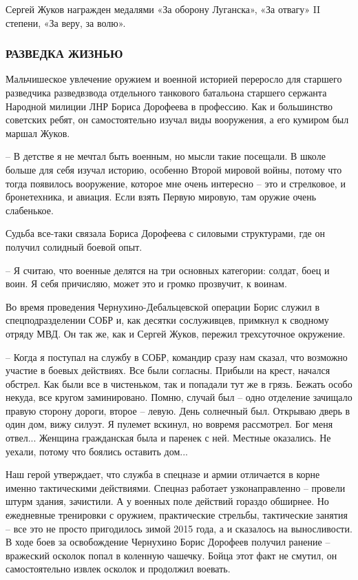Сергей Жуков награжден медалями «За оборону Луганска», «За отвагу» II степени,
«За веру, за волю».

\subsubsection{РАЗВЕДКА ЖИЗНЬЮ}

Мальчишеское увлечение оружием и военной историей переросло для старшего
разведчика разведвзвода отдельного танкового батальона старшего сержанта
Народной милиции ЛНР Бориса Дорофеева в профессию. Как и большинство советских
ребят, он самостоятельно изучал виды вооружения, а его кумиром был маршал
Жуков.

– В детстве я не мечтал быть военным, но мысли такие посещали. В школе больше
для себя изучал историю, особенно Второй мировой войны, потому что тогда
появилось вооружение, которое мне очень интересно – это и стрелковое, и
бронетехника, и авиация. Если взять Первую мировую, там оружие очень
слабенькое.

Судьба все-таки связала Бориса Дорофеева с силовыми структурами, где он получил
солидный боевой опыт.

– Я считаю, что военные делятся на три основных категории: солдат, боец и воин.
Я себя причисляю, может это и громко прозвучит, к воинам. 

Во время проведения Чернухино-Дебальцевской операции Борис служил в
спецподразделении СОБР и, как десятки сослуживцев, примкнул к сводному отряду
МВД. Он так же, как и Сергей Жуков, пережил трехсуточное окружение. 

– Когда я поступал на службу в СОБР, командир сразу нам сказал, что возможно
участие в боевых действиях. Все были согласны. Прибыли на крест, начался
обстрел. Как были все в чистеньком, так и попадали тут же в грязь. Бежать особо
некуда, все кругом заминировано. Помню, случай был – одно отделение зачищало
правую сторону дороги, второе – левую. День солнечный был. Открываю дверь в
один дом, вижу силуэт. Я пулемет вскинул, но вовремя рассмотрел. Бог меня
отвел... Женщина гражданская была и паренек с ней. Местные оказались. Не уехали,
потому что боялись оставить дом...

Наш герой утверждает, что служба в спецназе и армии отличается в корне именно
тактическими действиями. Спецназ работает узконаправленно – провели штурм
здания, зачистили. А у военных поле действий гораздо обширнее. Но ежедневные
тренировки с оружием, практические стрельбы, тактические занятия – все это не
просто пригодилось зимой 2015 года, а и сказалось на выносливости. В ходе боев
за освобождение Чернухино Борис Дорофеев получил ранение – вражеский осколок
попал в коленную чашечку. Бойца этот факт не смутил, он самостоятельно извлек
осколок и продолжил воевать.

